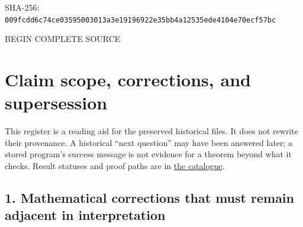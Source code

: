 \documentclass[
  10pt,
]{article}
\begin{document}
SHA-256:
\nolinkurl{009fcdd6c74ce03595003013a3e19196922e35bb4a12535ede4104e70ecf57bc}

BEGIN COMPLETE SOURCE

\hypertarget{claim-scope-corrections-and-supersession}{%
\section{Claim scope, corrections, and
supersession}\label{claim-scope-corrections-and-supersession}}

This register is a reading aid for the preserved historical files. It
does not rewrite their provenance. A historical ``next question'' may
have been answered later; a stored program's success message is not
evidence for a theorem beyond what it checks. Result statuses and proof
paths are in \href{../catalog/results.json}{the catalogue}.

\hypertarget{mathematical-corrections-that-must-remain-adjacent-in-interpretation}{%
\subsection{1. Mathematical corrections that must remain adjacent in
interpretation}\label{mathematical-corrections-that-must-remain-adjacent-in-interpretation}}
\end{document}

